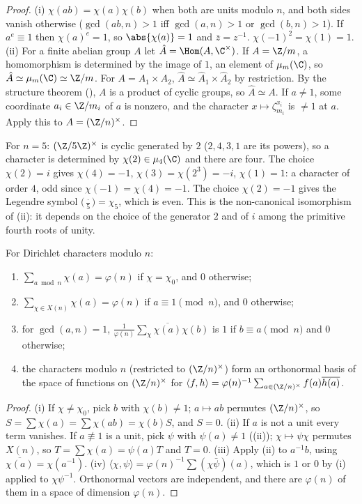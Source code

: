 \begin{proof}
(i) $\chi(ab)=\chi(a)\chi(b)$ when both are units modulo $n$, and both sides vanish otherwise ($\gcd(ab,n)>1$ iff $\gcd(a,n)>1$ or $\gcd(b,n)>1$).
If $a^e\equiv1$ then $\chi(a)^e=1$, so $\abs{\chi(a)}=1$ and $\bar z=z^{-1}$. $\chi(-1)^2=\chi(1)=1$.
(ii) For a finite abelian group $A$ let $\hat A=\Hom(A,\C^\times)$. If $A=\Z/m$, a homomorphism is determined by the image of $1$, an element of
$\mu_m(\C)$, so $\hat A\simeq\mu_m(\C)\simeq\Z/m$. For $A=A_1\times A_2$, $\hat A\simeq\hat A_1\times\hat A_2$ by restriction. By the structure theorem
(), $A$ is a product of cyclic groups, so $\hat A\simeq A$. If $a\ne1$, some coordinate $a_i\in\Z/m_i$ of $a$ is nonzero, and the
character $x\mapsto\zeta_{m_i}^{x_i}$ is $\ne1$ at $a$. Apply this to $A=(\Z/n)^\times$.
\end{proof}

For $n=5$: $(\Z/5\Z)^\times$ is cyclic generated by $2$ ($2,4,3,1$ are its powers), so a character is determined by $\chi(2)\in\mu_4(\C)$ and there are four. The
choice $\chi(2)=i$ gives $\chi(4)=-1$, $\chi(3)=\chi(2^3)=-i$, $\chi(1)=1$: a character of order $4$, odd since $\chi(-1)=\chi(4)=-1$. The choice $\chi(2)=-1$ gives
the Legendre symbol $\bigl(\frac\cdot5\bigr)=\chi_5$, which is even. This is the non-canonical isomorphism of (ii): it depends on the choice of the generator $2$ and
of $i$ among the primitive fourth roots of unity.

\begin{theorem}[orthogonality]\label{thm:rings:orthogonality}
For Dirichlet characters modulo $n$:
\begin{enumerate}[label=(\roman*)]
\item $\sum_{a\bmod n}\chi(a)=\varphi(n)$ if $\chi=\chi_0$, and $0$ otherwise;
\item $\sum_{\chi\in X(n)}\chi(a)=\varphi(n)$ if $a\equiv1\pmod n$, and $0$ otherwise;
\item for $\gcd(a,n)=1$, $\frac1{\varphi(n)}\sum_\chi\overline{\chi(a)}\chi(b)$ is $1$ if $b\equiv a\pmod n$ and $0$ otherwise;
\item the characters modulo $n$ (restricted to $(\Z/n)^\times$) form an orthonormal basis of the space of functions on $(\Z/n)^\times$ for
$\langle f,h\rangle=\varphi(n)^{-1}\sum_{a\in(\Z/n)^\times}f(a)\overline{h(a)}$.
\end{enumerate}
\end{theorem}

\begin{proof}
(i) If $\chi\ne\chi_0$, pick $b$ with $\chi(b)\ne1$; $a\mapsto ab$ permutes $(\Z/n)^\times$, so $S=\sum\chi(a)=\sum\chi(ab)=\chi(b)S$, and $S=0$. (ii) If $a$ is not a
unit every term vanishes. If $a\not\equiv1$ is a unit, pick $\psi$ with $\psi(a)\ne1$ ((ii)); $\chi\mapsto\psi\chi$ permutes $X(n)$, so
$T=\sum\chi(a)=\psi(a)T$ and $T=0$. (iii) Apply (ii) to $a^{-1}b$, using $\overline{\chi(a)}=\chi(a^{-1})$. (iv) $\langle\chi,\psi\rangle=\varphi(n)^{-1}\sum(\chi\bar\psi)(a)$, which is $1$ or
$0$ by (i) applied to $\chi\psi^{-1}$. Orthonormal vectors are independent, and there are $\varphi(n)$ of them in a space of dimension $\varphi(n)$.
\end{proof}

